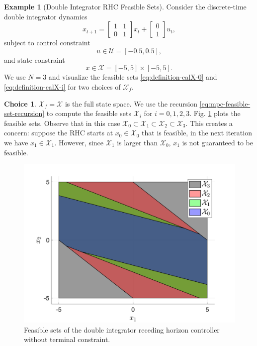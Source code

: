 \documentclass[
]{book}
\theoremstyle{definition}
\theoremstyle{definition}
\newtheorem{example}{Example}[chapter]
\theoremstyle{definition}
\theoremstyle{definition}
\theoremstyle{remark}
\begin{document}
\begin{example}[Double Integrator RHC Feasible Sets]
\protect\hypertarget{exm:compute-calXi-double-integrator}{}\label{exm:compute-calXi-double-integrator}Consider the discrete-time double integrator dynamics
\[
x_{t+1} = \begin{bmatrix} 1 & 1 \\ 0 & 1 \end{bmatrix} x_t + \begin{bmatrix} 0 \\ 1 \end{bmatrix} u_t,
\]
subject to control constraint
\[
u \in \mathcal{U} = [-0.5,0.5],
\]
and state constraint
\[
x \in \mathcal{X} = [-5, 5] \times [-5, 5].
\]
We use \(N=3\) and visualize the feasible sets \eqref{eq:definition-calX-0} and \eqref{eq:definition-calX-i} for two choices of \(\mathcal{X}_f\).

\textbf{Choice 1}. \(\mathcal{X}_f = \mathcal{X}\) is the full state space. We use the recursion \eqref{eq:mpc-feasible-set-recursion} to compute the feasible sets \(\mathcal{X}_i\) for \(i=0,1,2,3\). Fig. \ref{fig:double-integrator-feasible-set-1} plots the feasible sets. Observe that in this case \(\mathcal{X}_0 \subset \mathcal{X}_1 \subset \mathcal{X}_2 \subset \mathcal{X}_3\). This creates a concern: suppose the RHC starts at \(x_0 \in \mathcal{X}_0\) that is feasible, in the next iteration we have \(x_1 \in \mathcal{X}_1\). However, since \(\mathcal{X}_1\) is larger than \(\mathcal{X}_0\), \(x_1\) is not guaranteed to be feasible.

\begin{figure}

{\centering \includegraphics[width=0.6\linewidth]{images/double_integrator_feaset_1} 

}

\caption{Feasible sets of the double integrator receding horizon controller without terminal constraint.}\label{fig:double-integrator-feasible-set-1}
\end{figure}


\end{example}
\end{document}
